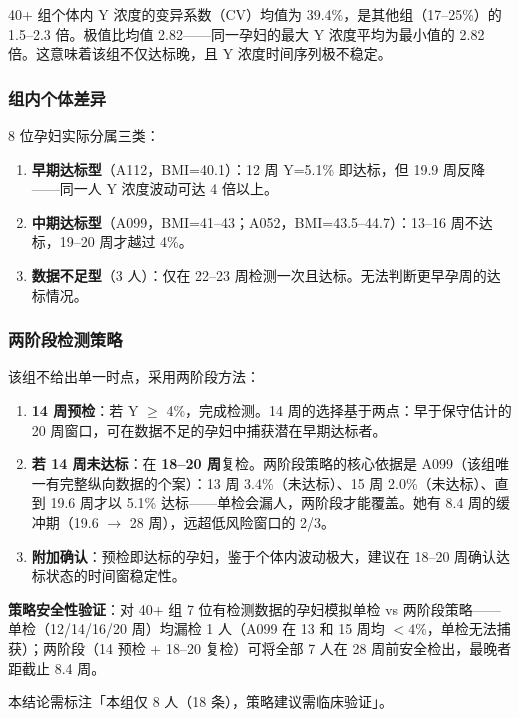 \documentclass{mcm-paper}
\begin{document}
40+ 组个体内 Y 浓度的变异系数（CV）均值为 39.4\%，是其他组（17--25\%）的 1.5--2.3 倍。极值比均值 2.82——同一孕妇的最大 Y 浓度平均为最小值的 2.82 倍。这意味着该组不仅达标晚，且 Y 浓度时间序列极不稳定。

\subsubsection{组内个体差异}

8 位孕妇实际分属三类：
\begin{enumerate}
    \item \textbf{早期达标型}（A112，BMI=40.1）：12 周 Y=5.1\% 即达标，但 19.9 周反降——同一人 Y 浓度波动可达 4 倍以上。
    \item \textbf{中期达标型}（A099，BMI=41--43；A052，BMI=43.5--44.7）：13--16 周不达标，19--20 周才越过 4\%。
    \item \textbf{数据不足型}（3 人）：仅在 22--23 周检测一次且达标。无法判断更早孕周的达标情况。
\end{enumerate}

\subsubsection{两阶段检测策略}

该组不给出单一时点，采用两阶段方法：

\begin{enumerate}
    \item \textbf{14 周预检}：若 Y $\geq$ 4\%，完成检测。14 周的选择基于两点：早于保守估计的 20 周窗口，可在数据不足的孕妇中捕获潜在早期达标者。
    \item \textbf{若 14 周未达标}：在 \textbf{18--20 周}复检。两阶段策略的核心依据是 A099（该组唯一有完整纵向数据的个案）：13 周 3.4\%（未达标）、15 周 2.0\%（未达标）、直到 19.6 周才以 5.1\% 达标——单检会漏人，两阶段才能覆盖。她有 8.4 周的缓冲期（19.6 $\to$ 28 周），远超低风险窗口的 2/3。
    \item \textbf{附加确认}：预检即达标的孕妇，鉴于个体内波动极大，建议在 18--20 周确认达标状态的时间窗稳定性。
\end{enumerate}

\textbf{策略安全性验证}：对 40+ 组 7 位有检测数据的孕妇模拟单检 vs 两阶段策略——单检（12/14/16/20 周）均漏检 1 人（A099 在 13 和 15 周均 $<4\%$，单检无法捕获）；两阶段（14 预检 + 18--20 复检）可将全部 7 人在 28 周前安全检出，最晚者距截止 8.4 周。

本结论需标注「本组仅 8 人（18 条），策略建议需临床验证」。
\end{document}
